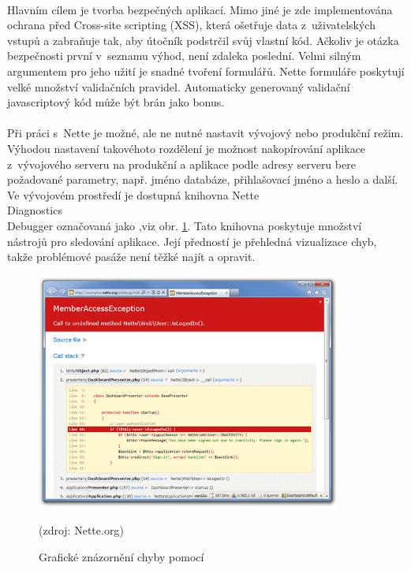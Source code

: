 \documentclass[11pt,a4paper,titlepage,oneside]{book}
\begin{document}
			\paragraph{} Hlavním cílem je tvorba bezpečných aplikací. Mimo jiné je zde implementována ochrana před Cross-site scripting (XSS), která ošetřuje data z~uživatelských vstupů a zabraňuje tak, aby útočník podstrčil svůj vlastní kód. Ačkoliv je otázka bezpečnosti první v~seznamu výhod, není zdaleka poslední. Velmi silným argumentem pro jeho užití je snadné tvoření formulářů. Nette formuláře poskytují velké množství validačních pravidel. Automaticky generovaný validační javascriptový kód může být brán jako bonus.

			\label{par:ladenka}
			\paragraph{} Při práci s~Nette je možné, ale ne nutné nastavit vývojový nebo produkční režim. Výhodou nastavení takovéhoto rozdělení je možnost nakopírování aplikace z~vývojového serveru na produkční a aplikace podle adresy serveru bere požadované parametry, např. jméno databáze, přihlašovací jméno a heslo a další. Ve vývojovém prostředí je dostupná knihovna Nette\\Diagnostics\\Debugger označovaná jako ,viz obr. \ref{fig:ladenka}. Tato knihovna poskytuje množství nástrojů pro sledování aplikace. Její předností je přehledná vizualizace chyb, takže problémové pasáže není těžké najít a opravit.
		\begin{figure}[!h]
			\begin{center}
				\includegraphics[width=10cm]{obrazky/ladenka.png}
				\caption{Grafické znázornění chyby pomocí }
				\label{fig:ladenka}
				(zdroj: Nette.org\cite{nette_web})
			\end{center}
		\end{figure}	
\end{document}

